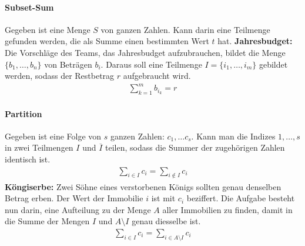 \paragraph{Subset-Sum} Gegeben ist eine Menge \(S\) von ganzen Zahlen. Kann darin eine Teilmenge gefunden werden, die als Summe einen bestimmten Wert \(t\) hat.
\textbf{Jahresbudget:} Die Vorschläge des Teams, das Jahresbudget aufzubrauchen, bildet die Menge \(\{b_1, \ldots, b_n\}\) von Beträgen \(b_i\). Daraus soll eine Teilmenge \(I=\{i_1, \ldots, i_m\}\) gebildet werden, sodass der Restbetrag \(r\) aufgebraucht wird.
\begin{align*}
    \sum_{k=1}^m b_{i_k} = r
\end{align*}
\paragraph{Partition} Gegeben ist eine Folge von \(s\) ganzen Zahlen: \(c_1, \ldots c_s\). Kann man die Indizes \(1, \ldots, s\) in zwei Teilmengen \(I\) und \(\overline{I}\) teilen, sodass die Summer der zugehörigen Zahlen identisch ist.
\begin{align*}
    \sum_{i\in I} c_i = \sum_{i \notin I} c_i
\end{align*}
\textbf{Köngiserbe:} Zwei Söhne eines verstorbenen Königs sollten genau denselben Betrag erben. Der Wert der Immobilie \(i\) ist mit \(c_i\) beziffert. Die Aufgabe besteht nun darin, eine Aufteilung zu der Menge \(A\) aller Immobilien zu finden, damit in die Summe der Mengen \(I\) und \(A\setminus I\) genau diesselbe ist.
\begin{align*}
        \sum_{i\in I} c_i = \sum_{i \in A\setminus I} c_i    
\end{align*}
